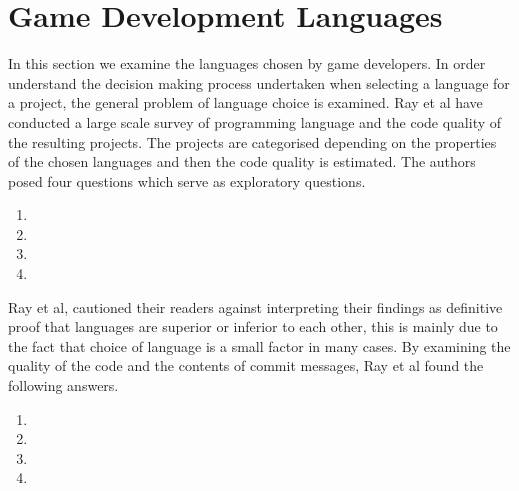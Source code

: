 \section{Game Development Languages}
In this section we examine the languages chosen by game developers. In order understand the decision making process undertaken when selecting a language for a project, the general problem of language choice is examined. Ray et al \cite{ray2014large} have conducted a large scale survey of programming language and the code quality of the resulting projects. The projects are categorised depending on the properties of the chosen languages and then the code quality is estimated. The authors posed four questions which serve as exploratory questions.

\begin{enumerate}
    \item {}
    \item {}
    \item {}
    \item {}
\end{enumerate}


Ray et al, cautioned their readers against interpreting their findings as definitive proof that languages are superior or inferior to each other, this is mainly due to the fact that choice of language is a small factor in many cases. By examining the quality of the code and the contents of commit messages, Ray et al found the following answers.

\begin{enumerate}
    \item {}
    \item {}
    \item {}
    \item {}
\end{enumerate}

